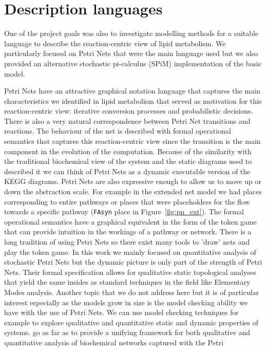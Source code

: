 \section{Description languages}
One of the project goals was also to investigate modelling methods
for a suitable language to describe the reaction-centric view of lipid
metabolism. We particularly focused on Petri Nets that were the main
language used but we also provided an alternative stochastic
pi-calculus (SPiM) implementation of the basic model.

Petri Nets have an attractive graphical notation language that
captures the main
characteristics we identified in lipid metabolism that served as
motivation for this reaction-centric view: iterative conversion
processes and probabilistic decisions. There is also a very natural
correspondence between Petri Net transitions and reactions. The
behaviour of the net is described with formal operational semantics
that captures this reaction-centric view since the transition is the
main component in the evolution of the computation. Because of the
similarity with the traditional biochemical view of the system and the
static diagrams used to described it we can think of Petri Nets as a
dynamic executable version of the KEGG diagrams. Petri Nets are also
expressive enough to allow us to move up or down the abstraction
scale. For example in the extended net model we had places
corresponding to entire pathways or places that were placeholders for
the flow towards a specific pathway (\texttt{FAsyn} place in
Figure~\ref{fig:pn_ext}). The formal operational semantics have a
graphical equivalent in the form of the token game that can provide
intuition in the workings of a pathway or network. There is a long
tradition of using Petri Nets so there exist many tools to 'draw' nets
and play the token game. In this work we mainly focused on
quantitative analysis of stochastic Petri Nets but the dynamic picture
is only part of the strength of Petri Nets. Their formal specification
allows for qualitative static topological analyses that yield the
same insides as standard techniques in the field like Elementary Modes
analysis. Another topic that we do not address here but it is of
particular interest especially as the models grow in size is the model
checking ability we have with the use of Petri Nets. We can use model
checking techniques for example to explore qualitative and quantitative
static and dynamic properties of systems. \citet{gilbert2007unifying}
go as far as to provide a unifying framework for both qualitative and
quantitative analysis of biochemical networks captured with the Petri
